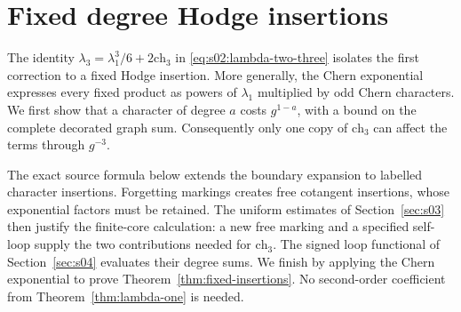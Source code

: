 \section{Fixed degree Hodge insertions}
\label{sec:s05}

The identity $\lambda_3=\lambda_1^3/6+2\mathrm{ch}_3$ in
\eqref{eq:s02:lambda-two-three} isolates the first correction to a
fixed Hodge insertion. More generally, the Chern exponential expresses
every fixed product as powers of $\lambda_1$ multiplied by odd Chern
characters. We first show that a character of degree $a$ costs
$g^{1-a}$, with a bound on the complete decorated graph sum.
Consequently only one copy of $\mathrm{ch}_3$ can affect the terms
through $g^{-3}$.

The exact source formula below extends the boundary expansion to
labelled character insertions. Forgetting markings creates free
cotangent insertions, whose exponential factors must be retained.
The uniform estimates of Section~\ref{sec:s03} then justify the
finite-core calculation: a new free marking and a specified self-loop
supply the two contributions needed for $\mathrm{ch}_3$. The signed
loop functional of Section~\ref{sec:s04} evaluates their degree sums.
We finish by applying the Chern exponential to prove
Theorem~\ref{thm:fixed-insertions}. No second-order coefficient from
Theorem~\ref{thm:lambda-one} is needed.




